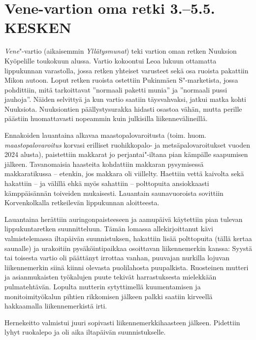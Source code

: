 
\section{Vene-vartion oma retki 3.–5.5. KESKEN}



\begin{multicols}{2}

\noindent \textit{Vene}"-vartio (aikaisemmin \mbox{\textit{Yllätysmunat}}) teki vartion oman retken Nuuksion Kyöpelille toukokuun alussa. Vartio kokoontui Leoa lukuun ottamatta lippukunnan varastolla, jossa retken yhteiset varusteet sekä osa ruoista pakattiin Mikon autoon. Loput retken ruoista ostettiin Pukinmäen S"-marketista, jossa pohdittiin, mitä tarkoittavat ''normaali paketti munia'' ja ''normaali pussi jauhoja''. Näiden selvittyä ja kun vartio saatiin täysvahvaksi, jatkui matka kohti Nuuksiota. Nuuksiontien päällystysurakka hidasti osastoa vähän, mutta perille päästiin huomattavasti nopeammin kuin julkisilla liikennevälineillä.

Ennakoiden lauantaina alkavaa maastopalovaroitusta (toim. huom. \textit{maastopalovaroitus} korvasi erilliset ruohikkopalo- ja metsäpalovaroitukset vuoden 2024 alusta), paistettiin makkarat jo perjantai"-iltana pian kämpälle saapumisen jälkeen. Tavanomaisia haasteita kohdattiin makkaran pysymisessä makkaratikussa -- etenkin, jos makkara oli viillelty. Haettiin vettä kaivolta sekä hakattiin -- ja välillä ehkä myös sahattiin -- polttopuita ansiokkaasti kämppäisännän toiveiden mukaisesti. Lauantain saunavuoroista sovittiin Korvenkolkalla retkeilevän lippukunnan aloitteesta.

Lauantaina herättiin auringonpaisteeseen ja aamupäivä käytettiin pian tulevan lippukuntaretken suunnitteluun. Tämän lomassa allekirjoittanut kävi valmistelemassa iltapäivän suunnistuksen, hakattiin lisää polttopuita (tällä kertaa saunalle) ja urakoitiin pysäköintipaikkaa osoittavan liikennemerkin kanssa: Syystä tai toisesta vartio oli päättänyt irrottaa vanhan, puuvajan nurkilla lojuvan liikennemerkin siinä kiinni olevasta puolilahosta puupalkista. Ruosteinen mutteri ja asianmukaisten työkalujen puute tekivät harrastuksesta mielekkään pulmatehtävän. Lopulta mutterin sytyttimellä kuumentamisen ja monitoimityökalun pihtien rikkomisen jälkeen palkki saatiin kirveellä hakkaamalla liikennemerkistä irti.

Hernekeitto valmistui juuri sopivasti liikennemerkkihaasteen jälkeen. Pidettiin lyhyt ruokalepo ja oli aika iltapäivän suunnistukselle.


\end{multicols}
